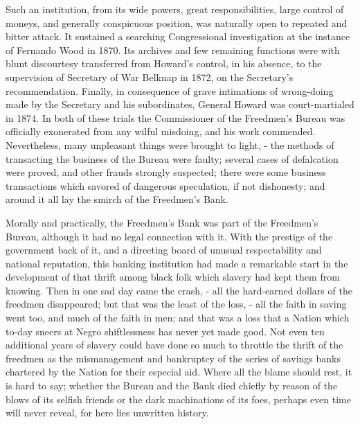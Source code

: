 Such an institution, from its wide powers, great responsibilities, large control of moneys, and generally conspicuous position, was naturally open to repeated and bitter attack. It sustained a searching Congressional investigation at the instance of Fernando Wood in 1870. Its archives and few remaining functions were with blunt discourtesy transferred from Howard’s control, in his absence, to the supervision of Secretary of War Belknap in 1872, on the Secretary’s recommendation. Finally, in consequence of grave intimations of wrong-doing made by the Secretary and his subordinates, General Howard was court-martialed in 1874. In both of these trials the Commissioner of the Freedmen’s Bureau was officially exonerated from any wilful misdoing, and his work commended. Nevertheless, many unpleasant things were brought to light, - the methods of transacting the business of the Bureau were faulty; several cases of defalcation were proved, and other frauds strongly suspected; there were some business transactions which savored of dangerous speculation, if not dishonesty; and around it all lay the smirch of the Freedmen’s Bank.\par

Morally and practically, the Freedmen’s Bank was part of the Freedmen’s Bureau, although it had no legal connection with it. With the prestige of the government back of it, and a directing board of unusual respectability and national reputation, this banking institution had made a remarkable start in the development of that thrift among black folk which slavery had kept them from knowing. Then in one sad day came the crash, - all the hard-earned dollars of the freedmen disappeared; but that was the least of the loss, - all the faith in saving went too, and much of the faith in men; and that was a loss that a Nation which to-day sneers at Negro shiftlessness has never yet made good. Not even ten additional years of slavery could have done so much to throttle the thrift of the freedmen as the mismanagement and bankruptcy of the series of savings banks chartered by the Nation for their especial aid. Where all the blame should rest, it is hard to say; whether the Bureau and the Bank died chiefly by reason of the blows of its selfish friends or the dark machinations of its foes, perhaps even time will never reveal, for here lies unwritten history.\par

